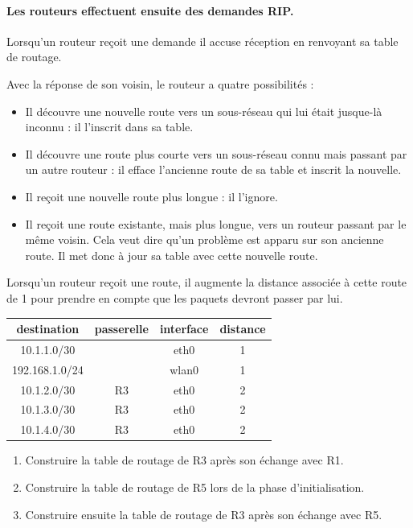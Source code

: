 \documentclass[a4paper,11pt]{article}
\begin{document}
\paragraph{Les routeurs effectuent ensuite des demandes RIP.} Lorsqu'un routeur reçoit une demande il accuse réception en renvoyant sa table de routage.

Avec la réponse de son voisin, le routeur a quatre possibilités :
\begin{itemize}
    \item Il découvre une nouvelle route vers un sous-réseau qui lui était jusque-là inconnu : il l’inscrit dans sa table.
    \item Il découvre une route plus courte vers un sous-réseau connu mais passant par un autre routeur : il efface l’ancienne route de sa table et inscrit la nouvelle.
    \item Il reçoit une nouvelle route plus longue : il l’ignore.
    \item Il reçoit une route existante, mais plus longue, vers un routeur passant par le même voisin. Cela veut dire qu’un problème est apparu sur son ancienne route. Il met donc à jour sa table avec cette nouvelle route.
\end{itemize}
\begin{aretenir}[Remarque]
    Lorsqu’un routeur reçoit une route, il augmente la distance associée à cette route de 1 pour prendre en compte que les paquets devront passer par
    lui.
\end{aretenir}
\begin{center}
    \begin{tabular}{|*{4}{c|}}
        \hline
        destination & passerelle & interface & distance \\
        \hline
        10.1.1.0/30 & & eth0 & 1\\
        \hline
        192.168.1.0/24 & & wlan0 & 1\\
        \hline
        10.1.2.0/30 & R3 & eth0 & 2 \\
        \hline
        10.1.3.0/30 & R3 & eth0 & 2 \\
        \hline
        10.1.4.0/30 & R3 & eth0 & 2 \\
        \hline
    \end{tabular}
\end{center}
\begin{activite}
\begin{enumerate}
    \item Construire la table de routage de R3 après son échange avec R1.
    \item Construire la table de routage de R5 lors de la phase d'initialisation.
    \item Construire ensuite la table de routage de R3 après son échange avec R5.
\end{enumerate}
\end{activite}
\end{document}
